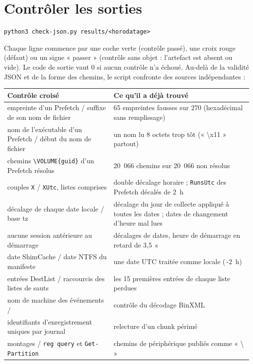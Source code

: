 \documentclass[11pt,a4paper,oneside]{report}
\begin{document}
\section{Contrôler les sorties}

\begin{lstlisting}
python3 check-json.py results/<horodatage>
\end{lstlisting}

Chaque ligne commence par une coche verte (contrôle passé), une croix rouge
(défaut) ou un signe « passer » (contrôle sans objet : l'artefact est absent ou
vide). Le code de
sortie vaut 0 si aucun contrôle n'a échoué. Au-delà de la validité JSON et de la
forme des chemins, le script confronte des sources indépendantes :

\begin{longtable}{@{}L{6.6cm}L{8.4cm}@{}}
\toprule
\textbf{Contrôle croisé} & \textbf{Ce qu'il a déjà trouvé} \\
\midrule
\endhead
empreinte d'un Prefetch / suffixe de son nom de fichier & 65 empreintes fausses sur 270 (hexadécimal sans remplissage) \\
nom de l'exécutable d'un Prefetch / début du nom de fichier & un nom lu 8 octets trop tôt (« \textbackslash x11 » partout) \\
chemins \texttt{\textbackslash VOLUME\{guid\}} d'un Prefetch résolus & 20~066 chemins sur 20~066 non résolus \\
couples \texttt{X} / \texttt{XUtc}, listes comprises & double décalage horaire ; \texttt{RunsUtc} des Prefetch décalés de 2~h \\
décalage de chaque date locale / base tz & décalage du jour de collecte appliqué à toutes les dates ; dates de changement d'heure mal lues \\
aucune session antérieure au démarrage & décalages de dates, heure de démarrage en retard de 3,5~s \\
date ShimCache / date NTFS du manifeste & une date UTC traitée comme locale (\,-2~h) \\
entrées DestList / raccourcis des listes de sauts & les 15 premières entrées de chaque liste perdues \\
nom de machine des événements /  & contrôle du décodage BinXML \\
identifiants d'enregistrement uniques par journal & relecture d'un chunk périmé \\
montages / \texttt{reg query} et \texttt{Get-Partition} & chemins de périphérique publiés comme « \textbackslash{} » \\

\end{longtable}
\end{document}
